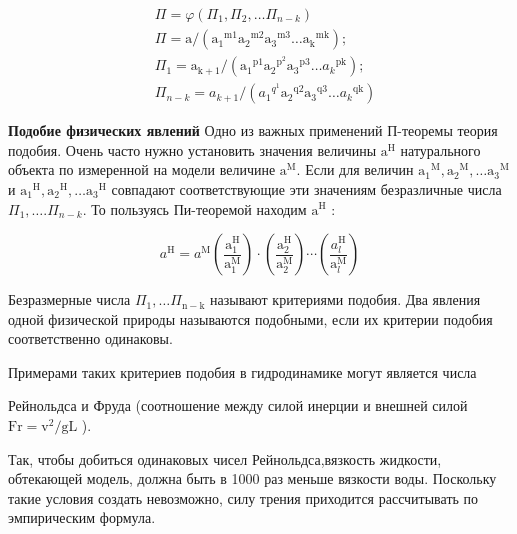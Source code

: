 $$\begin{aligned}  
&\Pi=\varphi\left(\Pi_{1}, \Pi_{2}, \ldots \Pi_{n-k}\right)\\
&\Pi=\mathrm{a} /\left(\mathrm{a}_{1}{ }^{\mathrm{m} 1} \mathrm{a}_{2}{ }^{\mathrm{m} 2} \mathrm{a}_{3}{ }^{\mathrm{m} 3} \ldots \mathrm{a}_{\mathrm{k}}{ }^{\mathrm{mk}}\right) ; \\
&\Pi_{1}=\mathrm{a}_{\mathrm{k}+1} /\left(\mathrm{a}_{1}{ }^{\mathrm{p} 1} \mathrm{a}_{2}{ }^{\mathrm{p}^{2}} \mathrm{a}_{3}{ }^{\mathrm{p} 3} \ldots a_{k}{ }^{\mathrm{pk}}\right) ; \\
&\Pi_{n-k}=a_{k+1} /\left(a_{1}{ }^{q^{1}} \mathrm{a}_{2}{ }^{\mathrm{q} 2} \mathrm{a}_{3}{ }^{\mathrm{q} 3} \ldots a_{k}{ }^{\mathrm{qk}}\right)
\end{aligned}
$$

\textbf{Подобие физических явлений}
Одно из важных применений П-теоремы теория подобия. Очень часто нужно установить значения величины $\mathrm{a}^{\mathrm{H}}$ натурального объекта по измеренной на модели величине $\mathrm{a}^{\mathrm{M}}$. Если для величин $\mathrm{a}_{1}{ }^{\mathrm{M}}, \mathrm{a}_{2}{ }^{\mathrm{M}}, \ldots \mathrm{a}_{3}{ }^{\mathrm{M}}$ и $\mathrm{a}_{1}{ }^{\mathrm{H}}, \mathrm{a}_{2}{ }^{\mathrm{H}}, \ldots \mathrm{a}_{3}{ }^{\mathrm{H}}$ совпадают соответствующие эти значениям безразличные числа $\Pi_{1}, \ldots . \Pi_{n-k}$. То пользуясь Пи-теоремой находим $\mathrm{a}^{\mathrm{H}}$ :

$$
a^{\mathrm{H}}=a^{\mathrm{M}}\left(\frac{\mathrm{a}_{1}^{\mathrm{H}}}{\mathrm{a}_{1}^{\mathrm{M}}}\right) \cdot\left(\frac{\mathrm{a}_{2}^{\mathrm{H}}}{\mathrm{a}_{2}^{\mathrm{M}}}\right) \cdots\left(\frac{a_{l}^{\mathrm{H}}}{\mathrm{a}_{l}^{\mathrm{M}}}\right)
$$

Безразмерные числа $\Pi_{1}, \ldots \Pi_{\mathrm{n}-\mathrm{k}}$ называют критериями подобия. Два явления одной физической природы называются подобными, если их критерии подобия соответственно одинаковы.

Примерами таких критериев подобия в гидродинамике могут является числа

Рейнольдса и Фруда (соотношение между силой инерции и внешней силой $\mathrm{Fr}=\mathrm{v}^{2} / \mathrm{gL}$ ).

Так, чтобы добиться одинаковых чисел Рейнольдса,вязкость жидкости, обтекающей модель, должна быть в 1000 раз меньше вязкости воды. Поскольку такие условия создать невозможно, силу трения приходится рассчитывать по эмпирическим формула.

